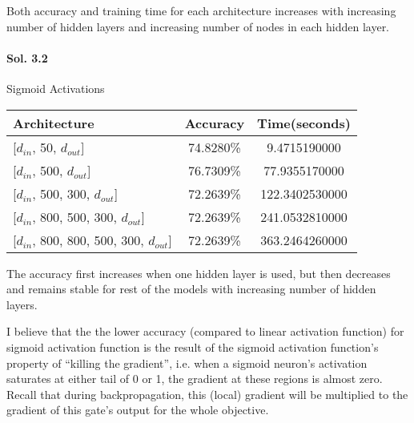 \documentclass[]{report}
\begin{document}
	Both accuracy and training time for each architecture increases with increasing number of hidden layers and increasing number of nodes in each hidden layer.

\paragraph{Sol. 3.2}
	Sigmoid Activations
	\begin{center}
		\begin{tabular}{l|c|c}
			\hline
			 Architecture                        & Accuracy   &   Time(seconds) \\
			\hline
			 {[$d_{in}$, 50, $d_{out}$]}                 & 74.8280\%   &    9.4715190000 \\
 			 {[$d_{in}$, 500, $d_{out}$]}                & 76.7309\%   &   77.9355170000 \\
 			 {[$d_{in}$, 500, 300, $d_{out}$]}           & 72.2639\%   &  122.3402530000 \\
 			 {[$d_{in}$, 800, 500, 300, $d_{out}$]}      & 72.2639\%   &  241.0532810000 \\
 			 {[$d_{in}$, 800, 800, 500, 300, $d_{out}$]} & 72.2639\%   &  363.2464260000 \\
			\hline
		\end{tabular}
	\end{center}

	The accuracy first increases when one hidden layer is used, but then decreases and remains stable for rest of the models with increasing number of hidden layers.

	I believe that the the lower accuracy (compared to linear activation function) for sigmoid activation function is the result of the sigmoid activation function's property of ``killing the gradient'', i.e. when a sigmoid neuron’s activation saturates at either tail of 0 or 1, the gradient at these regions is almost zero. Recall that during backpropagation, this (local) gradient will be multiplied to the gradient of this gate’s output for the whole objective.
\end{document}
